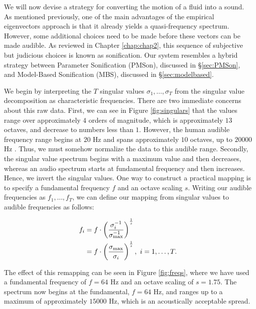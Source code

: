 We will now devise a strategy for converting the motion of a fluid into a sound. As mentioned previously, one of the main advantages of the empirical eigenvectors approach is that it already yields a quasi-frequency spectrum. However, some additional choices need to be made before these vectors can be made audible. As reviewed in Chapter \ref{chap:chap2}, this sequence of subjective but judicious choices is known as sonification. Our system resembles a hybrid strategy between Parameter Sonification (PMSon), discussed in \S \ref{sec:PMSon}, and Model-Based Sonification (MBS), discussed in \S \ref{sec:modelbased}.

We begin by interpreting the $T$ singular values $\sigma_1, \ldots, \sigma_T$ from the singular value decomposition as characteristic frequencies. There are two immediate concerns about this raw data. First, we can see in Figure \ref{fig:singulars} that the values range over approximately $4$ orders of magnitude, which is approximately $13$ octaves, and decrease to numbers less than $1$. However, the human audible frequency range begins at $20$ Hz and spans approximately $10$ octaves, up to $20000$ Hz \cite{rosen2011signals}. Thus, we must somehow normalize the data to this audible range. Secondly, the singular value spectrum begins with a maximum value and then decreases, whereas an audio spectrum starts at fundamental frequency and then increases. Hence, we invert the singular values. One way to construct a practical mapping is to specify a fundamental frequency $f$ and an octave scaling $s$. Writing our audible frequencies as $f_1, \ldots, f_T$, we can define our mapping from singular values to audible frequencies as follows:

\begin{equation} 
\begin{aligned}
f_i &= f \cdot \left(\frac{\sigma_{i}^{-1}}{\sigma_{\textnormal{max}}^{-1}}\right)^{\frac{1}{s}} \\
&= f \cdot \left(\frac{\sigma_{\textnormal{max}}}{\sigma_i}\right)^{\frac{1}{s}}, \ i = 1, \ldots, T.
\end{aligned}
\end{equation}

The effect of this remapping can be seen in Figure \ref{fig:freqs}, where we have used a fundamental frequency of $f = 64$ Hz and an octave scaling of $s = 1.75$. The spectrum now begins at the fundamental, $f = 64$ Hz, and ranges up to a maximum of approximately $15000$ Hz, which is an acoustically acceptable spread.

